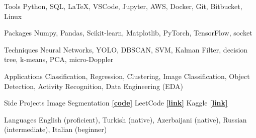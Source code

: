 

\begin{cvskills}

  \cvskill
    {Tools} %
    {Python, SQL, \LaTeX, VSCode, Jupyter, AWS, Docker, Git, Bitbucket, Linux} %

  \cvskill
    {Packages} %
    {Numpy, Pandas, Scikit-learn, Matplotlib, PyTorch, TensorFlow, socket} %

  \cvskill
    {Techniques} %
    {Neural Networks, YOLO, DBSCAN, SVM, Kalman Filter, decision tree, k-means, PCA, micro-Doppler} %
    
  \cvskill
    {Applications} %
    {Classification, Regression, Clustering, Image Classification, Object Detection, Activity Recognition, Data Engineering (EDA)} %
    

  \cvskill
    {Side Projects} %
    {Image Segmentation \href{https://github.com/enverbashirov/Image-Segmentation-Superpixels}{\textbf{[code]}} LeetCode \href{https://leetcode.com/enverbashirov/}{\textbf{[link]}} Kaggle \href{https://www.kaggle.com/enverbashirov}{\textbf{[link]}}} %

  \hline
  
  \cvskill
    {Languages} %
    {English (proficient), Turkish (native), Azerbaijani (native), Russian (intermediate), Italian (beginner)} %




\end{cvskills}
